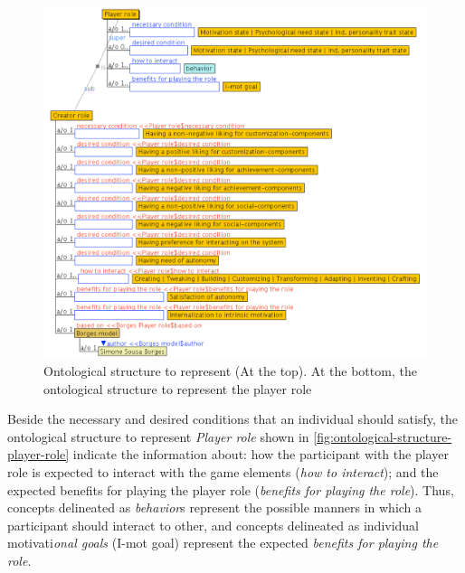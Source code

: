 \begin{figure}[!htbp]
 \caption[Ontological structure to represent player role]{Ontological structure to represent  (At the top). At the bottom, the ontological structure to represent the player role }
 \label{fig:ontological-structure-player-role}
 \centering
 \includegraphics[width=1\textwidth]{images/chap-ontogacles1/ontological-structure-player-role.png}
 \fautor
\end{figure}

Beside the necessary and desired conditions that an individual should satisfy, the ontological structure to represent \emph{Player role} shown in \autoref{fig:ontological-structure-player-role} indicate the information about:
how the participant with the player role is expected to interact with the game elements (\emph{how to interact});
and the expected benefits for playing the player role (\emph{benefits for playing the role}).
Thus, concepts delineated as \emph{behavior}s represent the possible manners in which a participant should interact to other, and concepts delineated as individual motivati\emph{onal goals} (I-mot goal) represent the expected \emph{benefits for playing the role}.


